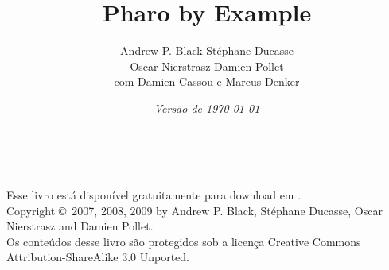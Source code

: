 \documentclass[a4paper,10pt,twoside]{book}
\begin{document}
\frontmatter
\setcounter{page}{1}
\pagestyle{headings}
\author{
	Andrew P. Black\quad
	St\'ephane Ducasse\\[1ex]
	Oscar Nierstrasz\quad
	Damien Pollet
	\\[4ex]
	com Damien Cassou e Marcus Denker}
\title{\Huge\bf Pharo by Example}
\isodate
\date{\emph{Versão de \today}}
\maketitle
~ %
\vfill
\begin{footnotesize}
\setlength{\parindent}{0pt}
Esse livro está disponível gratuitamente para download em \pbe.\\[1cm]

Copyright \copyright~2007, 2008, 2009 by Andrew P. Black, St\'ephane Ducasse, Oscar Nierstrasz and Damien Pollet.\\[1cm]

Os conteúdos desse livro são protegidos sob a licença Creative Commons Attribution-ShareAlike 3.0 Unported.


\end{footnotesize}
\end{document}

